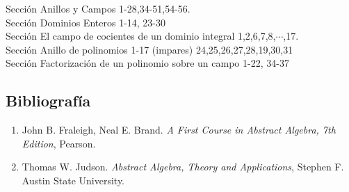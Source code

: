 
\usepackage{nopageno}  


	Sección   Anillos y Campos 1-28,34-51,54-56. \\
	Sección  Dominios Enteros 1-14, 23-30 \\
	Sección   El campo de cocientes de un dominio integral 1,2,6,7,8,$\cdots$,17. \\
	Sección  Anillo de polinomios 1-17 (impares) 24,25,26,27,28,19,30,31 \\
	Sección  Factorización de un polinomio sobre un campo  1-22, 34-37 \\
	



\subsection*{Bibliografía}

\begin{enumerate}
	\item 	John B. Fraleigh, Neal E. Brand. \textit{A First Course in Abstract Algebra, 7th Edition},  Pearson.
	\item 	Thomas W. Judson. \textit{Abstract Algebra, Theory and Applications}, Stephen F. Austin State University.
\end{enumerate}




\bye
